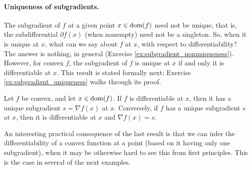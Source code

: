 \paragraph{Uniqueness of subgradients.}

The subgradient of $f$ at a given point $x \in \operatorname{dom}(f)$ need not be unique, that
is, the subdifferential $\partial f(x)$ (when nonempty) need not be a
singleton. So, when it is unique at $x$, what can we say about $f$ at $x$,
with respect to differentiability? The answer is nothing, in general (Exercise
\ref{ex:subgradient_nonuniqueness}). However, for convex $f$, the subgradient of
$f$ is unique at $x$ if and only it is differentiable at $x$. This result is
stated formally next; Exercise \ref{ex:subgradient_uniqueness} walks through its
proof. 

\begin{Theorem}
\label{thm:subgradient_uniqueness}
Let $f$ be convex, and let $x \in \operatorname{dom}(f)$. If $f$ is differentiable at $x$,
then it has a unique subgradient $s = \nabla f(x)$ at $x$. Conversely, if $f$
has a unique subgradient $s$ at $x$, then it is differentiable at $x$ and
$\nabla f(x) = s$.     
\end{Theorem} 


An interesting practical consequence of the last result is that we can infer the
differentiability of a convex function at a point (based on it having only one
subgradient), when it may be otherwise hard to see this from first
principles. This is the case in several of the next examples.

\medskip

